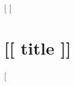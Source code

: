 \documentclass[letterpaper,openany,oneside,twocolumn]{book}
\begin{document}
[%
[%

\chapter*{[[ title ]]}

[%
\end{document}

